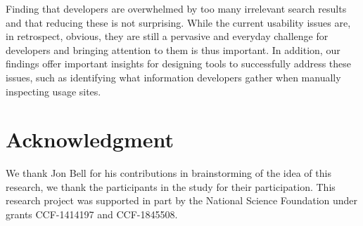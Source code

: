 \documentclass[conference]{IEEEtran}
\begin{document}
Finding that developers are overwhelmed by too many irrelevant search results and that reducing these is not surprising. While the current usability issues are, in retrospect, obvious, they are still a pervasive and everyday challenge for developers and bringing attention to them is thus important. In addition, our findings offer important insights for designing tools to successfully address these issues, such as identifying what information developers gather when manually inspecting usage sites. 






\section*{Acknowledgment}
We thank Jon Bell for his contributions in brainstorming of the idea of this research, we thank the participants in the study for their participation. 
This research project was supported in part by the National Science Foundation under grants CCF-1414197 and CCF-1845508.



\end{document}
